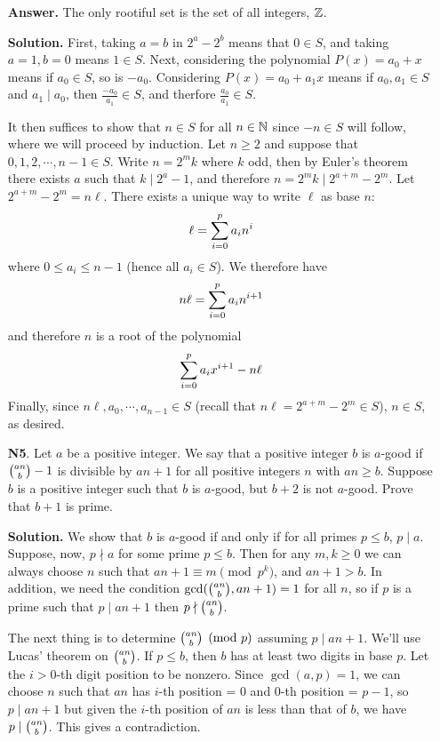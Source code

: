 \documentclass[11pt,a4paper]{article}
\begin{document}
\begin{enumerate}
	\textbf{Answer.} The only rootiful set is the set of all integers, ${\mathbb Z}$. 
	
	\textbf{Solution.} First, taking $a=b$ in $2^a-2^b$ means that $0\in S$, and taking $a=1, b=0$ means $1\in S$. Next, considering the polynomial $P(x)=a_0+x$ means if $a_0\in S$, so is $-a_0$. Considering $P(x)=a_0+a_1x$ means if $a_0, a_1\in S$ and $a_1\mid a_0$, then $\frac{-a_0}{a_1}\in S$, and therfore $\frac{a_0}{a_1}\in S$. 
	
	It then suffices to show that $n\in S$ for all $n\in{\mathbb N}$ since $-n\in S$ will follow, where we will proceed by induction. Let $n\ge 2$ and suppose that $0, 1, 2, \cdots , n-1\in S$.
	Write $n=2^mk$ where $k$ odd, then by Euler's theorem there exists $a$ such that $k\mid 2^a-1$, and therefore $n=2^mk\mid 2^{a+m}-2^m$. Let $2^{a+m}-2^m=n\ell$. There exists a unique way to write $\ell$ as base $n$: 
	\[
	\ell = \displaystyle\sum_{i=0}^{p}a_in^i
	\]
	where $0\le a_i\le n-1$ (hence all $a_i\in S$). We therefore have 
	\[
	n\ell =  \displaystyle\sum_{i=0}^{p}a_in^{i+1}
	\]
	and therefore $n$ is a root of the polynomial 
	\[
	\displaystyle\sum_{i=0}^{p}a_ix^{i+1}-n\ell
	\]
	Finally, since $n\ell, a_0, \cdots , a_{n-1}\in S$ (recall that $n\ell=2^{a+m}-2^m\in S$), $n\in S$, as desired. 
	
	\item[\textbf{N5}.] Let $a$ be a positive integer. We say that a positive integer $b$ is $a$-good if $\tbinom{an}{b}-1$ is divisible by $an+1$ for all positive integers $n$ with $an \geq b$. Suppose $b$ is a positive integer such that $b$ is $a$-good, but $b+2$ is not $a$-good. Prove that $b+1$ is prime.
	
	\textbf{Solution.} We show that $b$ is $a$-good if and only if for all primes $p\le b$, $p\mid a$. Suppose, now, $p\nmid a$ for some prime $p\le b$. Then for any $m, k\ge 0$ we can always choose $n$ such that $an+1\equiv m\pmod{p^k}$, and $an+1>b$. In addition, we need the condition $\gcd(\tbinom{an}{b}, an+1)=1$ for all $n$, so if $p$ is a prime such that $p\mid an+1$ then $p\nmid \tbinom{an}{b}$.
	
	The next thing is to determine $\tbinom{an}{b}\pmod{p}$ assuming $p\mid an+1$. We'll use Lucas' theorem on $\tbinom{an}{b}$. If $p\le b$, then $b$ has at least two digits in base $p$. Let the $i>0$-th digit position to be nonzero. Since $\gcd(a, p)=1$, we can choose $n$ such that $an$ has $i$-th position = 0 and $0$-th position = $p-1$, so $p\mid an+1$ but given the $i$-th position of $an$ is less than that of $b$, we have $p\mid \tbinom{an}{b}$. This gives a contradiction.
	

\end{enumerate}
\end{document}
